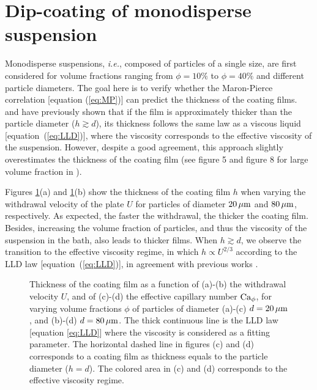 \documentclass{jfm}
\begin{document}

\section{Dip-coating of monodisperse suspension} \label{sec:mono}

Monodisperse suspensions, \textit{i.e.}, composed of particles of a single size, are first considered for volume fractions ranging from $\phi=10\%$ to $\phi=40\%$ and different particle diameters. The goal here is to verify whether the Maron-Pierce correlation [equation (\ref{eq:MP})] can predict the thickness of the coating films. \cite{gans2019dip} and \cite{palma2019dip} have previously shown that if the film is approximately thicker than the particle diameter ($h \gtrsim d$), its thickness follows the same law as a viscous liquid [equation~(\ref{eq:LLD})], where the viscosity corresponds to the effective viscosity of the suspension. However, despite a good agreement, this approach slightly overestimates the thickness of the coating film (see figure 5 and figure 8 for large volume fraction in \cite{gans2019dip}).

Figures \ref{fgr:Figure_3}(a) and \ref{fgr:Figure_3}(b) show the thickness of the coating film $h$ when varying the withdrawal velocity of the plate $U$ for particles of diameter $20\,\mu{\rm m}$ and $80\,\mu{\rm m}$, respectively. As expected, the faster the withdrawal, the thicker the coating film. Besides, increasing the volume fraction of particles, and thus the viscosity of the suspension in the bath, also leads to thicker films. When $h \gtrsim d$, we observe the transition to the effective viscosity regime, in which $h \propto U^{2/3}$ according to the LLD law [equation~(\ref{eq:LLD})], in agreement with previous works \cite[][]{gans2019dip,palma2019dip}.

\begin{figure}
    \centering
    \caption{Thickness of the coating film as a function of (a)-(b) the withdrawal velocity $U$, and of
        (c)-(d) the effective capillary number ${\rm Ca}_{\phi}$, for varying volume fractions $\phi$ of particles of diameter (a)-(c) $d = 20\,\mu{\rm m}$, and (b)-(d) $d = 80\,\mu{\rm m}$. The thick continuous line is the LLD law [equation \ref{eq:LLD}] where the viscosity is considered as a fitting parameter. The horizontal dashed line in figures (c) and (d) corresponds to a coating film as thickness equals to the particle diameter ($h=d$). The colored area in (c) and (d) corresponds to the effective viscosity regime.}
    \label{fgr:Figure_3}
\end{figure}
\end{document}
